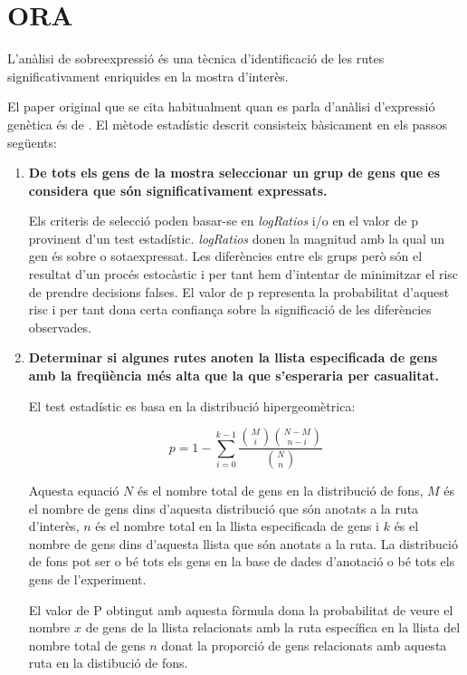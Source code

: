 \section{\gls{ORA}}

L'anàlisi de sobreexpressió és una tècnica d'identificació de les rutes significativament enriquides en la mostra d'interès. 

El paper original que se cita habitualment quan es parla d'anàlisi d'expressió genètica és de \cite{boyle2004go}. El mètode estadístic descrit consisteix bàsicament en els passos següents:

\begin{enumerate}
\item \textbf{De tots els gens de la mostra seleccionar un grup de gens que es considera que són significativament expressats.}

Els criteris de selecció poden basar-se en \textit{\gls{logRatio}s} i/o en el valor de p provinent d'un test estadístic. \textit{\gls{logRatio}s} donen la magnitud amb la qual un gen és sobre o sotaexpressat. Les diferències entre els grups però són el resultat d'un procés estocàstic i per tant hem d'intentar de minimitzar el risc de prendre decisions falses. El valor de p representa la probabilitat d'aquest risc i per tant dona certa confiança sobre la significació de les diferències observades.

\item \textbf{Determinar si algunes rutes anoten la llista especificada de gens amb la freqüència més alta que la que s’esperaria per casualitat.} 

El test estadístic es basa en la distribució hipergeomètrica: 

$$p = 1 - \displaystyle\sum_{i = 0}^{k-1}\frac{{M \choose i}{{N-M} \choose {n-i}}} {{N \choose n}}$$

Aquesta equació $N$ és el nombre total de gens en la distribució de fons, $M$ és el nombre de gens dins d'aquesta distribució que són anotats a la ruta d'interès, $n$ és el nombre total en la llista especificada de gens i $k$ és el nombre de gens dins d'aquesta llista que són anotats a la ruta. La distribució de fons pot ser o bé tots els gens en la base de dades d'anotació o bé tots els gens de l'experiment.

El valor de P obtingut amb aquesta fòrmula dona la probabilitat de veure el nombre $x$ de gens de la llista relacionats amb la ruta específica en la llista del nombre total de gens $n$ donat la proporció de gens relacionats amb aquesta ruta en la distibució de fons.
\end{enumerate}

